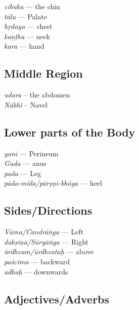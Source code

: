 
\begin{multicols}{2}
\textit{cibuka} --- the chin \\
\textit{tālu} --- Palate \\
\textit{hṛdaya} --- chest\\ 
\textit{kaṇṭha} --- neck\\
\textit{kara} --- hand
\end{multicols}

\subsection*{Middle Region}

\begin{multicols}{2}
\textit{udara} -- the abdomen \\
\textit{Nābhi} -- Navel 
\end{multicols}

\subsection*{Lower parts of the Body}

\begin{multicols}{2}
\textit{yoni} --- Perineum \\
\textit{Guda} --- anus\\
\textit{pada} --- Leg\\
\textit{pāda-mūla/pārṣṇi-bhāga} --- heel
\end{multicols}
\newpage

\subsection*{Sides/Directions}

\begin{multicols}{2}
\textit{Vāma/Candrāṅga} --- Left \\
\textit{dakṣiṇa/Sūryāṅga} --- Right\\
\textit{ūrdhvam/ūrdhvataḥ} --- above\\ 
\textit{paścima} --- backward \\
\textit{adhaḥ} --- downwards 
\end{multicols}

\subsection*{Adjectives/Adverbs}

